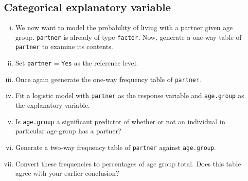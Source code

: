 \documentclass[12pt,a4paper]{article}\usepackage[]{graphicx}\usepackage[]{color}
\begin{document}
\subsection{Categorical explanatory variable}
\begin{enumerate}[(i)]
\item We now want to model the probability of living with a partner given age group. \texttt{partner} is already of type \texttt{factor}. Now, generate a one-way table of \texttt{partner} to examine its contents. %

\item Set \texttt{partner} = \texttt{Yes} as the reference level.

\item Once again geenerate the one-way frequency table of \texttt{partner}.

\item Fit a logistic model with \texttt{partner} as the response variable and \texttt{age.group} as the explanatory variable.

\item Is \texttt{age.group} a significant predictor of whether or not an individual in particular age group has a partner?

\item Generate a two-way frequency table of \texttt{partner} against \texttt{age.group}. 

\item Convert these frequencies to percentages of age group total. Does this table agree with your earlier conclusion?

\end{enumerate}
\end{document}

